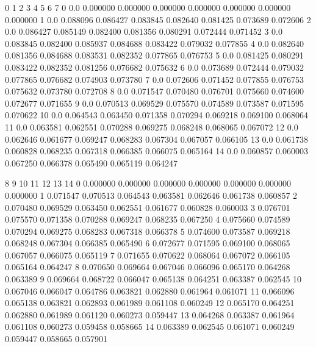 \documentclass[letterpaper,10pt,english]{sphinxmanual}
\begin{document}
\begin{sphinxVerbatim}[commandchars=\\\{\}]
     0         1         2         3         4         5         6         7   \PYGZbs{}
0   0.0  0.000000  0.000000  0.000000  0.000000  0.000000  0.000000  0.000000   
1   0.0  0.088096  0.086427  0.083845  0.082640  0.081425  0.073689  0.072606   
2   0.0  0.086427  0.085149  0.082400  0.081356  0.080291  0.072444  0.071452   
3   0.0  0.083845  0.082400  0.085937  0.084688  0.083422  0.079032  0.077855   
4   0.0  0.082640  0.081356  0.084688  0.083531  0.082352  0.077865  0.076753   
5   0.0  0.081425  0.080291  0.083422  0.082352  0.081256  0.076682  0.075632   
6   0.0  0.073689  0.072444  0.079032  0.077865  0.076682  0.074903  0.073780   
7   0.0  0.072606  0.071452  0.077855  0.076753  0.075632  0.073780  0.072708   
8   0.0  0.071547  0.070480  0.076701  0.075660  0.074600  0.072677  0.071655   
9   0.0  0.070513  0.069529  0.075570  0.074589  0.073587  0.071595  0.070622   
10  0.0  0.064543  0.063450  0.071358  0.070294  0.069218  0.069100  0.068064   
11  0.0  0.063581  0.062551  0.070288  0.069275  0.068248  0.068065  0.067072   
12  0.0  0.062646  0.061677  0.069247  0.068283  0.067304  0.067057  0.066105   
13  0.0  0.061738  0.060828  0.068235  0.067318  0.066385  0.066075  0.065164   
14  0.0  0.060857  0.060003  0.067250  0.066378  0.065490  0.065119  0.064247   

          8         9         10        11        12        13        14  
0   0.000000  0.000000  0.000000  0.000000  0.000000  0.000000  0.000000  
1   0.071547  0.070513  0.064543  0.063581  0.062646  0.061738  0.060857  
2   0.070480  0.069529  0.063450  0.062551  0.061677  0.060828  0.060003  
3   0.076701  0.075570  0.071358  0.070288  0.069247  0.068235  0.067250  
4   0.075660  0.074589  0.070294  0.069275  0.068283  0.067318  0.066378  
5   0.074600  0.073587  0.069218  0.068248  0.067304  0.066385  0.065490  
6   0.072677  0.071595  0.069100  0.068065  0.067057  0.066075  0.065119  
7   0.071655  0.070622  0.068064  0.067072  0.066105  0.065164  0.064247  
8   0.070650  0.069664  0.067046  0.066096  0.065170  0.064268  0.063389  
9   0.069664  0.068722  0.066047  0.065138  0.064251  0.063387  0.062545  
10  0.067046  0.066047  0.064786  0.063821  0.062880  0.061964  0.061071  
11  0.066096  0.065138  0.063821  0.062893  0.061989  0.061108  0.060249  
12  0.065170  0.064251  0.062880  0.061989  0.061120  0.060273  0.059447  
13  0.064268  0.063387  0.061964  0.061108  0.060273  0.059458  0.058665  
14  0.063389  0.062545  0.061071  0.060249  0.059447  0.058665  0.057901  
\end{sphinxVerbatim}
\end{document}
